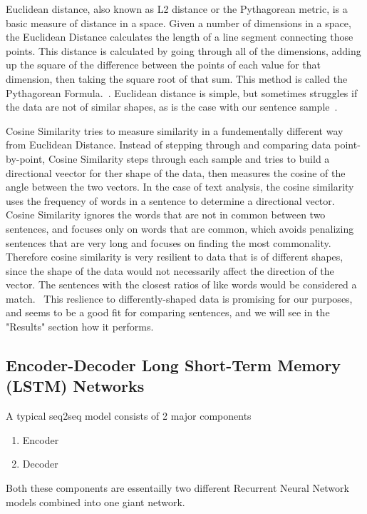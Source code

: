 \documentclass[runningheads]{llncs}
\begin{document}
Euclidean distance, also known as L2 distance or the Pythagorean metric, is a basic measure of distance in a space. Given a number of dimensions in a space, the Euclidean Distance calculates the length of a line segment connecting those points. This distance is calculated by going through all of the dimensions, adding up the square of the difference between the points of each value for that dimension, then taking the square root of that sum. This method is called the Pythagorean Formula.~\cite{ref_url19}. Euclidean distance is simple, but sometimes struggles if the data are not of similar shapes, as is the case with our sentence sample~\cite{ref_url19}.

Cosine Similarity tries to measure similarity in a fundementally different way from Euclidean Distance. Instead of stepping through and comparing data point-by-point, Cosine Similarity steps through each sample and tries to build a directional veector for ther shape of the data, then measures the cosine of the angle between the two vectors. In the case of text analysis, the cosine similarity uses the frequency of words in a sentence to determine a directional vector. Cosine Similarity ignores the words that are not in common between two sentences, and focuses only on words that are common, which avoids penalizing sentences that are very long and focuses on finding the most commonality. Therefore cosine similarity is very resilient to data that is of different shapes, since the shape of the data would not necessarily affect the direction of the vector. The sentences with the closest ratios of like words would be considered a match.~\cite{ref_book1} This reslience to differently-shaped data is promising for our purposes, and seems to be a good fit for comparing sentences, and we will see in the "Results" section how it performs.

	\subsection{Encoder-Decoder Long Short-Term Memory (LSTM) Networks}	
	A typical seq2seq model consists of 2 major components
	\begin{enumerate}
		\item Encoder
		\item Decoder
	\end{enumerate}
	
	Both these components are essentailly two different Recurrent Neural Network models combined into one giant network.
	
\end{document}
